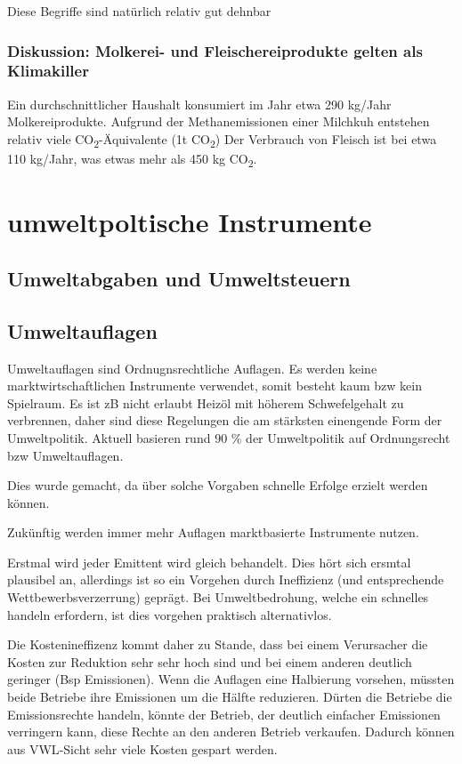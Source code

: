 \documentclass[11pt]{scrbook}
\begin{document}
Diese Begriffe sind natürlich relativ gut dehnbar


\subsubsection{Diskussion: Molkerei- und Fleischereiprodukte gelten als Klimakiller}
Ein durchschnittlicher Haushalt konsumiert im Jahr etwa 290 kg/Jahr Molkereiprodukte.
Aufgrund der Methanemissionen einer Milchkuh entstehen relativ viele  CO\textsubscript{2}-Äquivalente (1t CO\textsubscript{2})
Der Verbrauch von Fleisch ist bei etwa 110 kg/Jahr, was etwas mehr als 450 kg CO\textsubscript{2}.


\section{umweltpoltische Instrumente}

\subsection{Umweltabgaben und Umweltsteuern}



\subsection{Umweltauflagen}
Umweltauflagen sind Ordnugnsrechtliche Auflagen.
Es werden keine marktwirtschaftlichen Instrumente verwendet, somit besteht kaum bzw kein Spielraum.
Es ist zB nicht erlaubt Heizöl mit höherem Schwefelgehalt zu verbrennen, daher sind diese Regelungen die am stärksten einengende Form der Umweltpolitik.
Aktuell basieren rund 90 \% der Umweltpolitik auf Ordnungsrecht bzw Umweltauflagen.

Dies wurde gemacht, da über solche Vorgaben schnelle Erfolge erzielt werden können.

Zukünftig werden immer mehr Auflagen marktbasierte Instrumente nutzen.

Erstmal wird jeder Emittent wird gleich behandelt.
Dies hört sich ersmtal plausibel an, allerdings ist so ein Vorgehen durch Ineffizienz (und entsprechende Wettbewerbsverzerrung) geprägt.
Bei Umweltbedrohung, welche ein schnelles handeln erfordern, ist dies vorgehen praktisch alternativlos.

Die Kostenineffizenz kommt daher zu Stande, dass bei einem Verursacher die Kosten zur Reduktion sehr sehr hoch sind und bei einem anderen deutlich geringer (Bsp Emissionen).
Wenn die Auflagen eine Halbierung vorsehen, müssten beide Betriebe ihre Emissionen um die Hälfte reduzieren.
Dürten die Betriebe die Emissionsrechte handeln, könnte der Betrieb, der deutlich einfacher Emissionen verringern kann, diese Rechte an den anderen Betrieb verkaufen.
Dadurch können aus \ac{VWL}-Sicht sehr viele Kosten gespart werden.
\end{document}
